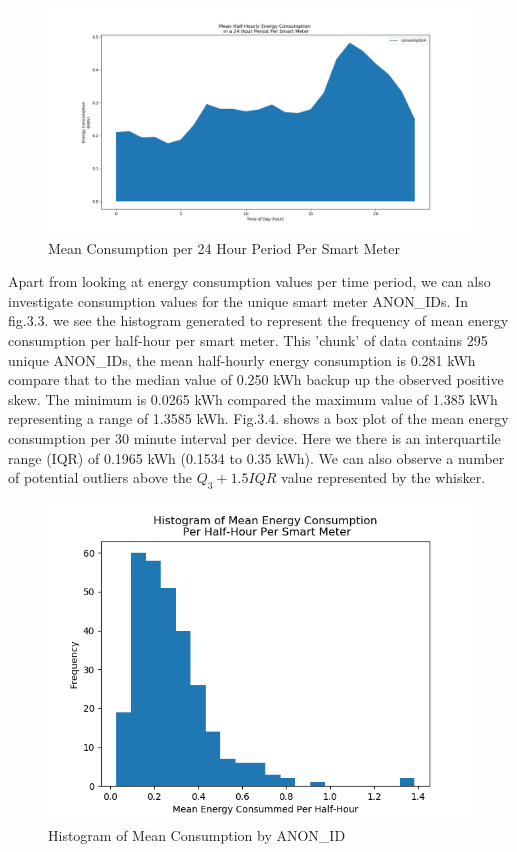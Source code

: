         \begin{figure}[H]
        \centering     
        \includegraphics[width=1\textwidth]{Figures/EDA_images/mean_consumption_one_day.png}
        \caption{Mean Consumption per 24 Hour Period Per Smart Meter}
        \label{fig:Daily Consumption}
        \end{figure}
        
        Apart from looking at energy consumption values per time period, we can also investigate consumption values for the unique smart meter ANON\_IDs. In fig.3.3. we see the histogram generated to represent the frequency of mean energy consumption per half-hour per smart meter. This 'chunk' of data contains 295 unique ANON\_IDs, the mean half-hourly energy consumption is 0.281 kWh compare that to the median value of 0.250 kWh backup up the observed positive skew. The minimum is 0.0265 kWh compared the maximum value of 1.385 kWh representing a range of 1.3585 kWh. Fig.3.4. shows a box plot of the mean energy consumption per 30 minute interval per device. Here we there is an interquartile range (IQR) of 0.1965 kWh (0.1534 to 0.35 kWh). We can also observe a number of potential outliers above the $Q_3 + 1.5IQR$ value represented by the whisker.
        
        \begin{figure}[H]
        \centering     
        \includegraphics[width=1\textwidth]{Figures/EDA_images/mean_consumption_histogram.png}
        \caption{Histogram of Mean Consumption by ANON\_ID}
        \label{fig:Daily Consumption}
        \end{figure}
        
